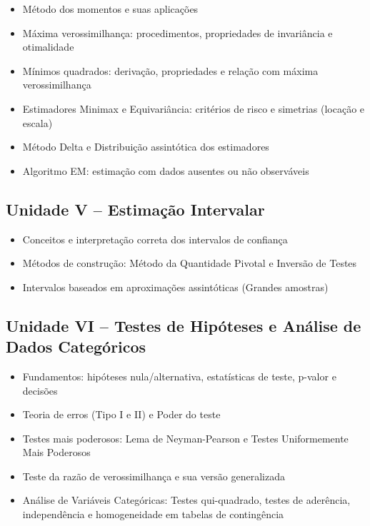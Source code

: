 \documentclass[
  letterpaper,
  DIV=11,
  numbers=noendperiod]{scrreprt}
\begin{document}
\begin{itemize}
\item
  Método dos momentos e suas aplicações
\item
  Máxima verossimilhança: procedimentos, propriedades de invariância e
  otimalidade
\item
  Mínimos quadrados: derivação, propriedades e relação com máxima
  verossimilhança
\item
  Estimadores Minimax e Equivariância: critérios de risco e simetrias
  (locação e escala)
\item
  Método Delta e Distribuição assintótica dos estimadores
\item
  Algoritmo EM: estimação com dados ausentes ou não observáveis
\end{itemize}

\subsection*{Unidade V -- Estimação
Intervalar}\label{unidade-v-estimauxe7uxe3o-intervalar}

\begin{itemize}
\item
  Conceitos e interpretação correta dos intervalos de confiança
\item
  Métodos de construção: Método da Quantidade Pivotal e Inversão de
  Testes
\item
  Intervalos baseados em aproximações assintóticas (Grandes amostras)
\end{itemize}

\subsection*{Unidade VI -- Testes de Hipóteses e Análise de Dados
Categóricos}\label{unidade-vi-testes-de-hipuxf3teses-e-anuxe1lise-de-dados-categuxf3ricos}

\begin{itemize}
\item
  Fundamentos: hipóteses nula/alternativa, estatísticas de teste,
  p-valor e decisões
\item
  Teoria de erros (Tipo I e II) e Poder do teste
\item
  Testes mais poderosos: Lema de Neyman-Pearson e Testes Uniformemente
  Mais Poderosos
\item
  Teste da razão de verossimilhança e sua versão generalizada
\item
  Análise de Variáveis Categóricas: Testes qui-quadrado, testes de
  aderência, independência e homogeneidade em tabelas de contingência
\end{itemize}
\end{document}
